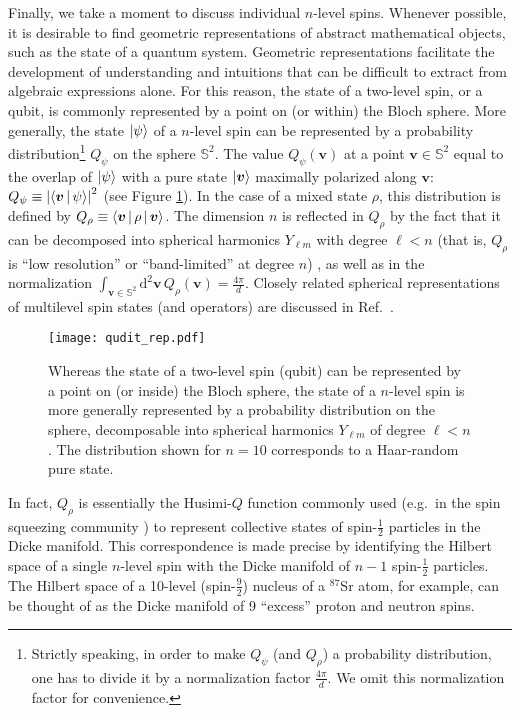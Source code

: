 \documentclass[nofootinbib,twocolumn]{revtex4-2}
\newcommand{\p}[1]{\left(#1\right)} %
\newcommand{\bk}{\Braket} %
\renewcommand{\v}{\bm} %
\renewcommand{\dd}{\text{d}} %
\newcommand{\1}{\mathds{1}}
\renewcommand{\SS}{\mathbb{S}}
\begin{document}
Finally, we take a moment to discuss individual $n$-level spins.
Whenever possible, it is desirable to find geometric representations of abstract mathematical objects, such as the state of a quantum system.
Geometric representations facilitate the development of understanding and intuitions that can be difficult to extract from algebraic expressions alone.
For this reason, the state of a two-level spin, or a qubit, is commonly represented by a point on (or within) the Bloch sphere.
More generally, the state $\ket\psi$ of a $n$-level spin can be represented by a probability distribution\footnote{Strictly speaking, in order to make $Q_\psi$ (and $Q_\rho$) a probability distribution, one has to divide it by a normalization factor $\frac{4\pi}{d}$.
We omit this normalization factor for convenience.} $Q_\psi$ on the sphere $\SS^2$.
The value $Q_\psi\p{\v v}$ at a point $\v v\in\SS^2$ equal to the overlap of $\ket\psi$ with a pure state $\ket{\v v}$ maximally polarized along $\v v$: $Q_\psi\equiv\abs{\bk{\v v|\psi}}^2$ (see Figure \ref{fig:spin_dist}).
In the case of a mixed state $\rho$, this distribution is defined by $Q_\rho\equiv\bk{\v v|\rho|\v v}$.
The dimension $n$ is reflected in $Q_\rho$ by the fact that it can be decomposed into spherical harmonics $Y_{\ell m}$ with degree $\ell<n$ (that is, $Q_\rho$ is ``low resolution'' or ``band-limited'' at degree $n$) \cite{perlin2020qudit}, as well as in the normalization $\int_{\v v\in\SS^2}\dd^2\v v\,Q_\rho\p{\v v}=\frac{4\pi}{d}$.
Closely related spherical representations of multilevel spin states (and operators) are discussed in Ref.~\cite{li2013weylwignermoyal}.

\begin{figure}
\centering
\texttt{[image: qudit\_rep.pdf]}
\caption{
Whereas the state of a two-level spin (qubit) can be represented by a point on (or inside) the Bloch sphere, the state of a $n$-level spin is more generally represented by a probability distribution on the sphere, decomposable into spherical harmonics $Y_{\ell m}$ of degree $\ell<n$.
The distribution shown for $n=10$ corresponds to a Haar-random pure state.
}
\label{fig:spin_dist}
\end{figure}

In fact, $Q_\rho$ is essentially the Husimi-$Q$ function commonly used (e.g.~in the spin squeezing community \cite{ma2011quantum}) to represent collective states of spin-$\frac{1}{2}$ particles in the Dicke manifold.
This correspondence is made precise by identifying the Hilbert space of a single $n$-level spin with the Dicke manifold of $n-1$ spin-$\frac{1}{2}$ particles.
The Hilbert space of a 10-level (spin-$\frac92$) nucleus of a ${}^{87}$Sr atom, for example, can be thought of as the Dicke manifold of 9 ``excess'' proton and neutron spins.
\end{document}
